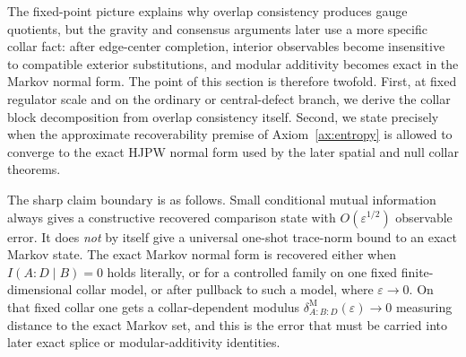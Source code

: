 \documentclass[11pt]{article}
\begin{document}
The fixed-point picture explains why overlap consistency produces gauge quotients, but the gravity and consensus arguments later use a more specific collar fact: after edge-center completion, interior observables become insensitive to compatible exterior substitutions, and modular additivity becomes exact in the Markov normal form. The point of this section is therefore twofold. First, at fixed regulator scale and on the ordinary or central-defect branch, we derive the collar block decomposition from overlap consistency itself. Second, we state precisely when the approximate recoverability premise of Axiom~\ref{ax:entropy} is allowed to converge to the exact HJPW normal form used by the later spatial and null collar theorems.

The sharp claim boundary is as follows. Small conditional mutual information always gives a constructive recovered comparison state with \(O(\varepsilon^{1/2})\) observable error. It does \emph{not} by itself give a universal one-shot trace-norm bound to an exact Markov state. The exact Markov normal form is recovered either when \(I(A:D\mid B)=0\) holds literally, or for a controlled family on one fixed finite-dimensional collar model, or after pullback to such a model, where \(\varepsilon\to0\). On that fixed collar one gets a collar-dependent modulus \(\delta^{\mathrm M}_{A:B:D}(\varepsilon)\to0\) measuring distance to the exact Markov set, and this is the error that must be carried into later exact splice or modular-additivity identities.
\end{document}
